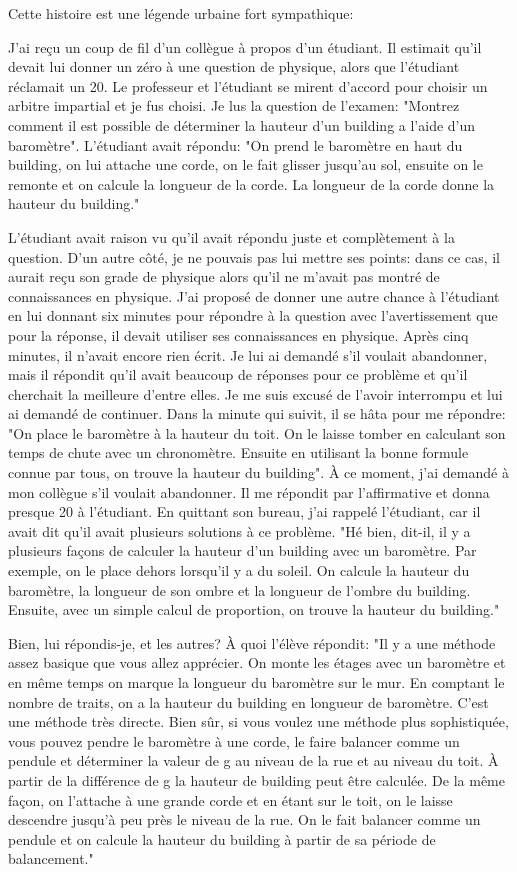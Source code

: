 Cette histoire est une légende urbaine fort sympathique:

J'ai reçu un coup de fil d'un collègue à propos d'un étudiant. Il estimait qu'il devait lui donner un zéro à une question de physique, alors que l'étudiant réclamait un 20. Le professeur et l'étudiant se mirent d'accord pour choisir un arbitre impartial et je fus choisi. Je lus la question de l'examen: "Montrez comment il est possible de déterminer la hauteur d'un building a l'aide d'un baromètre". L'étudiant avait répondu: "On prend le baromètre en haut du building, on lui attache une corde, on le fait glisser jusqu'au sol, ensuite on le remonte et on calcule la longueur de la corde. La longueur de la corde donne la hauteur du building."

L'étudiant avait raison vu qu'il avait répondu juste et complètement à la question. D'un autre côté, je ne pouvais pas lui mettre ses points: dans ce cas, il aurait reçu son grade de physique alors qu'il ne m'avait pas montré de connaissances en physique. J'ai proposé de donner une autre chance à l'étudiant en lui donnant six minutes pour répondre à la question avec l'avertissement que pour la réponse, il devait utiliser ses connaissances en physique. Après cinq minutes, il n'avait encore rien écrit. Je lui ai demandé s'il voulait abandonner, mais il répondit qu'il avait beaucoup de réponses pour ce problème et qu'il cherchait la meilleure d'entre elles. Je me suis excusé de l'avoir interrompu et lui ai demandé de continuer. Dans la minute qui suivit, il se hâta pour me répondre: "On place le baromètre à la hauteur du toit. On le laisse tomber en calculant son temps de chute avec un chronomètre. Ensuite en utilisant la bonne formule connue par tous, on trouve la hauteur du building".  À ce moment, j'ai demandé à mon collègue s'il voulait abandonner. Il me répondit par l'affirmative et donna presque 20 à l'étudiant. En quittant son bureau, j'ai rappelé l'étudiant, car il avait dit qu'il avait plusieurs solutions à ce problème. "Hé bien, dit-il, il y a plusieurs façons de calculer la hauteur d'un building avec un baromètre. Par exemple, on le place dehors lorsqu'il y a du soleil. On calcule la hauteur du baromètre, la longueur de son ombre et la longueur de l'ombre du building. Ensuite, avec un simple calcul de proportion, on trouve la hauteur du building."

Bien, lui répondis-je, et les autres? À quoi l'élève répondit: "Il y a une méthode assez basique que vous allez apprécier. On monte les  étages avec un baromètre et en même temps on marque la longueur du baromètre sur le mur. En comptant le nombre de traits, on a la hauteur du building en longueur de baromètre. C'est une méthode très directe. Bien sûr, si vous voulez une méthode plus sophistiquée, vous pouvez pendre le baromètre à une corde, le faire balancer comme un pendule et déterminer la valeur de g au niveau de la rue et au niveau du toit. À partir de la différence de g la hauteur de building peut être calculée. De la même façon, on l'attache à une grande corde et en étant sur le toit, on le laisse descendre jusqu'à peu près le niveau de la rue. On le fait balancer comme un pendule et on calcule la hauteur du building à partir de sa période de balancement."

